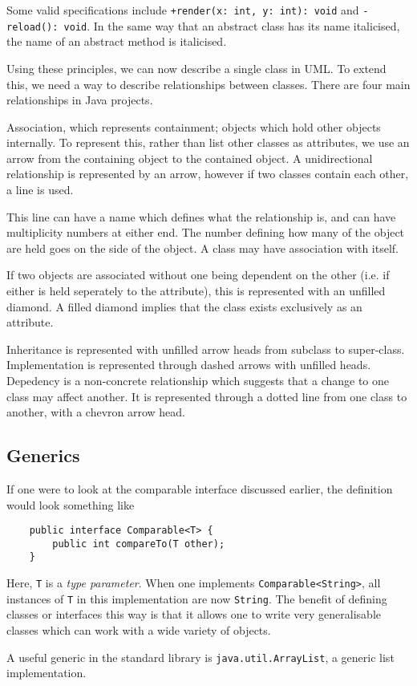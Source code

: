 \documentclass[12pt]{report}
\newcommand{\code}[1]{\lstinline{#1}}
\begin{document}
\begin{flushleft}
Some valid specifications include \code{+render(x: int, y: int): void} and
\code{-reload(): void}. In the same way that an abstract class has its name
italicised, the name of an abstract method is italicised. \par
Using these principles, we can now describe a single
class in UML. To extend this, we need a way to describe relationships between
classes. There are four main relationships in Java projects.

\bigskip
Association, which represents containment; objects which hold other
objects internally. To represent this, rather than list other classes
as attributes, we use an arrow from the containing object to the
contained object. A unidirectional relationship is represented by an
arrow, however if two classes contain each other, a line is used. \par
This line can have a name which defines what the relationship is, and can have
multiplicity numbers at either end. The number defining how many of the object
are held goes on the side of the object. A class may have association with
itself. \par
If two objects are associated without one being dependent on the other (i.e. if
either is held seperately to the attribute), this is represented with an
unfilled diamond. A filled diamond implies that the class exists exclusively as
an attribute.

\bigskip
Inheritance is represented with unfilled arrow heads from subclass to
super-class. Implementation is represented through dashed arrows with unfilled
heads. Depedency is a non-concrete relationship which suggests that a change to
one class may affect another. It is represented through a dotted line from one
class to another, with a chevron arrow head.

\subsection*{Generics}

If one were to look at the comparable interface discussed earlier, the
definition would look something like

\begin{lstlisting}
    public interface Comparable<T> {
        public int compareTo(T other);
    }
\end{lstlisting}

Here, \code{T} is a \textit{type parameter}. When one implements
\code{Comparable<String>}, all instances of \code{T} in this implementation
are now \code{String}. The benefit of defining classes or interfaces this way
is that it allows one to write very generalisable classes which can work with
a wide variety of objects. \par
A useful generic in the standard library is \code{java.util.ArrayList}, a
generic list implementation.


\end{flushleft}
\end{document}
